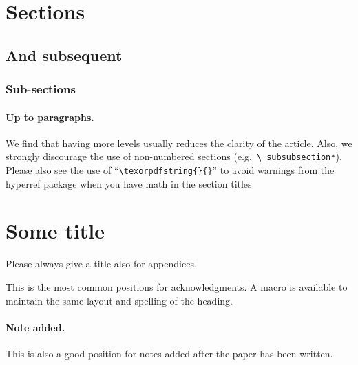 \documentclass[a4paper,11pt]{article}
\begin{document}
\section{Sections}
\subsection{And subsequent}
\subsubsection{Sub-sections}
\paragraph{Up to paragraphs.} We find that having more levels usually
reduces the clarity of the article. Also, we strongly discourage the
use of non-numbered sections (e.g.~\texttt{\textbackslash
  subsubsection*}).  Please also see the use of
``\texttt{\textbackslash texorpdfstring\{\}\{\}}'' to avoid warnings
from the hyperref package when you have math in the section titles



\appendix
\section{Some title}
Please always give a title also for appendices.





\acknowledgments

This is the most common positions for acknowledgments. A macro is
available to maintain the same layout and spelling of the heading.

\paragraph{Note added.} This is also a good position for notes added
after the paper has been written.





\end{document}
